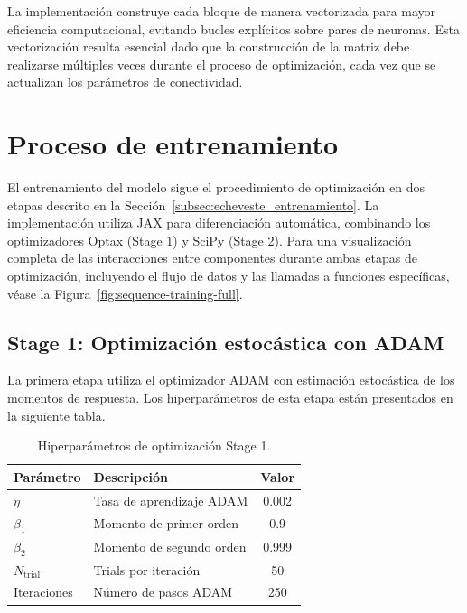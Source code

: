 La implementación construye cada bloque de manera vectorizada para mayor eficiencia computacional, evitando bucles explícitos sobre pares de neuronas. Esta vectorización resulta esencial dado que la construcción de la matriz debe realizarse múltiples veces durante el proceso de optimización, cada vez que se actualizan los parámetros de conectividad.


\section{Proceso de entrenamiento}
\label{sec:impl_entrenamiento}

El entrenamiento del modelo sigue el procedimiento de optimización en dos etapas descrito en la Sección~\ref{subsec:echeveste_entrenamiento}. La implementación utiliza JAX para diferenciación automática, combinando los optimizadores Optax (Stage 1) y SciPy (Stage 2). Para una visualización completa de las interacciones entre componentes durante ambas etapas de optimización, incluyendo el flujo de datos y las llamadas a funciones específicas, véase la Figura~\ref{fig:sequence-training-full}.

\subsection{Stage 1: Optimización estocástica con ADAM}
\label{subsec:impl_stage1}

La primera etapa utiliza el optimizador \acrshort{ADAM} con estimación estocástica de los momentos de respuesta. Los hiperparámetros de esta etapa están presentados en la siguiente tabla.

\begin{table}[H]
\centering
\caption{Hiperparámetros de optimización Stage 1.}
\label{tab:stage1_params}
\begin{tabular}{llc}
\toprule
\textbf{Parámetro} & \textbf{Descripción} & \textbf{Valor} \\
\midrule
$\eta$ & Tasa de aprendizaje ADAM & 0.002 \\
$\beta_1$ & Momento de primer orden & 0.9 \\
$\beta_2$ & Momento de segundo orden & 0.999 \\
$N_\text{trial}$ & Trials por iteración & 50 \\
Iteraciones & Número de pasos ADAM & 250 \\
\bottomrule
\end{tabular}
\end{table}


